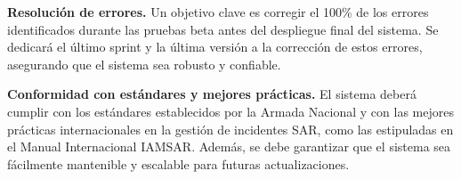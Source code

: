 \textbf{Resolución de errores.} Un objetivo clave es corregir el 100\% de los errores identificados durante las pruebas beta antes del despliegue
final del sistema. Se dedicará el último sprint y la última versión a la corrección de estos errores, asegurando que el sistema sea robusto y confiable.

\textbf{Conformidad con estándares y mejores prácticas.} El sistema deberá cumplir con los estándares establecidos por la Armada Nacional y con 
las mejores prácticas internacionales en la gestión de incidentes SAR, como las estipuladas en el Manual Internacional IAMSAR. Además, se debe 
garantizar que el sistema sea fácilmente mantenible y escalable para futuras actualizaciones.